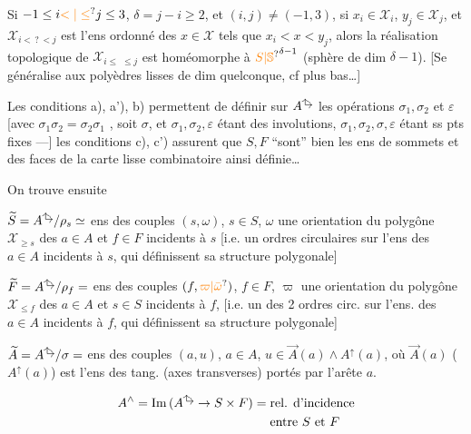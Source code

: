 Si $-1\leq i\unsure{<|\leq}j\leq3$,  $\delta=j-i\geq2$, et  $(i,j)\ne(-1,3)$, si $x_i\in\mathcal X_i$, $y_j\in\mathcal X_j$,
et $\mathcal X_{i<\,?\,<j}$ est l'ens ordonné des $x\in\mathcal X$ \deleted{$\unsure{<}$} tels que
$x_i<x<y_j$, alors la réalisation topologique de $\mathcal X_{i\leq\,\,\leq j}$ est
homéomorphe à \deleted{$\unsure{\Sigma}$} $\unsure{S|\mathbb S}^{\delta-1}$ (sphère de dim $\delta-1$). [Se
généralise aux polyèdres lisses de dim quelconque, cf plus
bas\ldots]

Les conditions a), a'), b) permettent de définir sur
$A^{\vcenter{\hbox{\tikz[x=.15cm,y=.15cm]{\draw[->] (0,0)--(0,1.2);\draw[->] (0,0)--(1.3,0);}}}}$ les opérations $\sigma_1,\sigma_2$ et $\varepsilon$ [avec $\sigma_1\sigma_2=\sigma_2\sigma_1$ , soit $\sigma$,
et $\sigma_1,\sigma_2,\varepsilon$ étant des involutions, $\sigma_1,\sigma_2,\sigma,\varepsilon$ étant ss
pts fixes ---] les conditions c), c') assurent que
$S,F$ ``sont'' bien les ens de sommets et des faces de la
carte lisse combinatoire ainsi définie\ldots

On trouve ensuite

$\widetilde S=A^{\vcenter{\hbox{\tikz[x=.15cm,y=.15cm]{\draw[->] (0,0)--(0,1.2);\draw[->] (0,0)--(1.3,0);}}}}/\rho_s\simeq$ ens des couples $(s,\omega)$, $s\in S$, $\omega$ une orientation du 
polygône $\mathcal X_{\geq s}$ des $a\in A$ et $f\in F$ incidents à $s$
[i.e. un  ordres circulaires sur l'ens des $a\in A$ incidents à $s$, qui définissent sa structure polygonale]

$\widetilde F=A^{\vcenter{\hbox{\tikz[x=.15cm,y=.15cm]{\draw[->] (0,0)--(0,1.2);\draw[->] (0,0)--(1.3,0);}}}}/\rho_f=$ ens des couples $(f,\unsure{\varpi|\bar\omega})$, $f\in F$, $\varpi$ une orientation du
polygône $\mathcal X_{\leq f}$ des  $a\in A$ et $s\in S$ incidents à $f$,
[i.e. un des 2 ordres circ. sur l'ens. des
$a\in A$ incidents à $f$, qui définissent sa structure polygonale]

$\widetilde A=A^{\vcenter{\hbox{\tikz[x=.15cm,y=.15cm]{\draw[->] (0,0)--(0,1.2);\draw[->] (0,0)--(1.3,0);}}}}/\sigma=$ ens des couples $(a,u)$, $a\in A$, $u\in\vec A(a)\wedge A^\uparrow(a)$,
où $\vec A(a)$ ($A^\uparrow(a)$) est l'ens des  tang.
(axes transverses) portés par l'arête $a$.

\[
A^\wedge=\mathrm{Im}\,(A^{\vcenter{\hbox{\tikz[x=.15cm,y=.15cm]{\draw[->] (0,0)--(0,1.2);\draw[->] (0,0)--(1.3,0);}}}}\to S\times F)
=\begin{aligned}[t]&\text{rel. d'incidence}\\&\text{entre }S\text{ et }F\end{aligned}
\]

